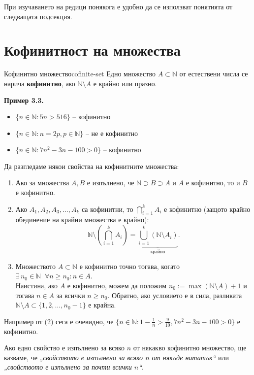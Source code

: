 При изучаването на редици понякога е удобно да се използват понятията от следващата подсекция.

\section{Кофинитност на множества}

\begin{definition}{Кофинитно множество}{cofinite-set}
Едно множество $A \subset \mathbb{N}$ от естествени числа се нарича \textbf{кофинитно}, ако $\mathbb{N} \setminus A$ е крайно или празно.
\end{definition}

\noindent\textbf{Пример 3.3.}
\begin{itemize}
    \item $\{n \in \mathbb{N} : 5n > 516\}$ -- кофинитно
    \item $\{n \in \mathbb{N} : n = 2p, p \in \mathbb{N}\}$ -- не е кофинитно
    \item $\{n \in \mathbb{N} : 7n^2 - 3n - 100 > 0\}$ -- кофинитно
\end{itemize}

Да разгледаме някои свойства на кофинитните множества:
\begin{enumerate}
    \item Ако за множества $A, B$ е изпълнено, че $\mathbb{N} \supset B \supset A$ и $A$ е кофинитно, то и $B$ е кофинитно.
    \item Ако $A_1, A_2, A_3, \dots, A_k$ са кофинитни, то $\bigcap_{i=1}^k A_i$ е кофинитно (защото крайно обединение на крайни множества е крайно):
    \[
    \mathbb{N} \setminus \left(\bigcap_{i=1}^k A_i\right) = \underbrace{\bigcup_{i=1}^k (\mathbb{N} \setminus A_i)}_{\text{крайно}}.
    \]
    \item Множеството $A \subset \mathbb{N}$ е кофинитно точно тогава, когато $\exists\, n_0 \in \mathbb{N} \;\; \forall n \ge n_0 : n \in A$. \\
    Наистина, ако $A$ е кофинитно, можем да положим $n_0 := \max(\mathbb{N} \setminus A) + 1$ и тогава $n \in A$ за всички $n \ge n_0$. Обратно, ако условието е в сила, разликата $\mathbb{N} \setminus A \subset \{1, 2, \dots, n_0 - 1\}$ е крайна.
\end{enumerate}

Например от (2) сега е очевидно, че $\{n \in \mathbb{N} : 1 - \frac{1}{n} > \frac{9}{10}, 7n^2 - 3n - 100 > 0\}$ е кофинитно.

Ако едно свойство е изпълнено за всяко $n$ от някакво кофинитно множество, ще казваме, че \emph{„свойството е изпълнено за всяко $n$ от някъде нататък“} или \emph{„свойството е изпълнено за почти всички $n$“}.

